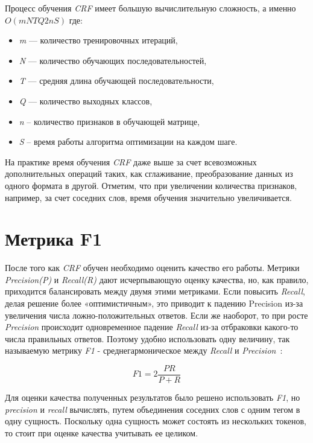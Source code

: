 \documentclass{csmathnotes}
\begin{document}
Процесс обучения \emph{CRF} имеет большую вычислительную сложность, а именно $O(mNTQ2nS)$ где:
\begin{itemize}
    \item \emph{m} — количество тренировочных итераций,
    \item \emph{N} — количество обучающих последовательностей,
    \item \emph{T} — средняя длина обучающей последовательности,
    \item \emph{Q} — количество выходных классов,
    \item \emph{n} – количество признаков в обучающей матрице,
    \item \emph{S} – время работы алгоритма оптимизации на каждом шаге. 
\end{itemize}


На практике время обучения \emph{CRF} даже выше за счет всевозможных дополнительных операций таких, как сглаживание, преобразование данных из одного формата в другой.
Отметим, что при увеличении количества признаков, например, за счет соседних слов, время обучения значительно увеличивается. 

\section*{Метрика F1}
После того как \emph{CRF} обучен необходимо оценить качество его работы. 
Метрики \emph{Precision(P)} и \emph{Recall(R)} дают исчерпывающую оценку качества, но, как правило, приходится балансировать между двумя этими метриками.
Если повысить \emph{Recall}, делая решение более «оптимистичным», это приводит к падению Precision из-за увеличения числа ложно-положительных ответов.
Если же наоборот, то при росте \emph{Precision} происходит одновременное падение \emph{Recall} из-за отбраковки какого-то числа правильных ответов.
Поэтому удобно использовать одну величину, так называемую метрику \emph{F1} - среднегармоническое между \emph{Recall} и \emph{Precision}~\cite{F1}:

\begin{equation}
F1 = 2\frac{P R}{P + R} 
\end{equation}

Для оценки качества полученных результатов было решено использовать \emph{F1}, но \emph{precision} и \emph{recall} вычислять, путем объединения соседних слов с одним тегом в одну сущность.
Поскольку одна сущность может состоять из нескольких токенов, то стоит при оценке качества учитывать ее целиком. 
\end{document}
